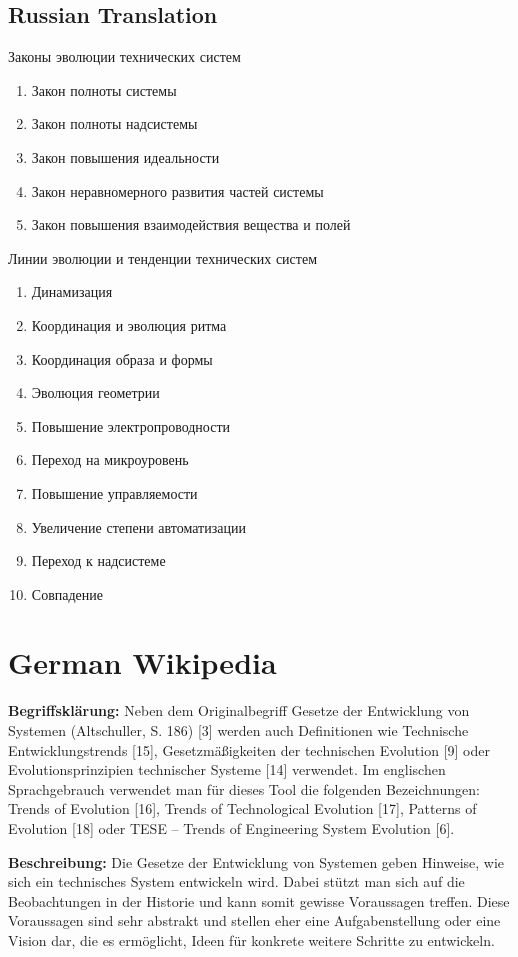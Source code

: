 \documentclass[11pt,a4paper]{article}
\begin{document}
\subsection*{Russian Translation}

Законы эволюции технических систем
\begin{enumerate} \itemsep0pt
\item Закон полноты системы
\item Закон полноты надсистемы
\item Закон повышения идеальности
\item Закон неравномерного развития частей системы
\item Закон повышения взаимодействия вещества и полей
\end{enumerate}

Линии эволюции и тенденции технических систем
\begin{enumerate} \itemsep0pt
\item Динамизация
\item Координация и эволюция ритма
\item Координация образа и формы
\item Эволюция геометрии
\item Повышение электропроводности
\item Переход на микроуровень
\item Повышение управляемости
\item Увеличение степени автоматизации
\item Переход к надсистеме
\item Совпадение 
\end{enumerate}

\section*{German Wikipedia}

\textbf{Begriffsklärung:} Neben dem Originalbegriff Gesetze der Entwicklung
von Systemen (Alt\-schuller, S. 186) [3] werden auch Definitionen wie
Technische Entwicklungstrends [15], Gesetz\-mäßigkeiten der technischen
Evolution [9] oder Evolutionsprinzipien technischer Systeme [14] verwendet. Im
englischen Sprachgebrauch verwendet man für dieses Tool die folgenden
Be\-zeichnungen: Trends of Evolution [16], Trends of Technological Evolution
[17], Patterns of Evolution [18] oder TESE – Trends of Engineering System
Evolution [6].

\textbf{Beschreibung:} Die Gesetze der Entwicklung von Systemen geben
Hinweise, wie sich ein technisches System entwickeln wird. Dabei stützt man
sich auf die Beobachtungen in der Historie und kann somit gewisse Voraussagen
treffen. Diese Voraussagen sind sehr abstrakt und stellen eher eine
Aufgabenstellung oder eine Vision dar, die es ermöglicht, Ideen für konkrete
weitere Schritte zu entwickeln.
\end{document}
